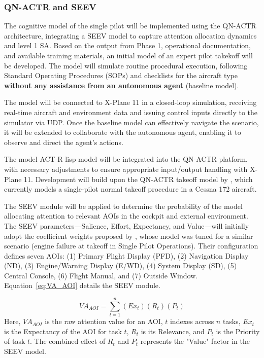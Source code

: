 \documentclass[12pt,a4paper]{article} %
\begin{document}
	\subsubsection{QN-ACTR and SEEV}
	\label{qn-actr-seev}
	The cognitive model of the single pilot will be implemented using the QN-ACTR architecture, integrating a SEEV model to capture attention allocation dynamics and level 1 SA. Based on the output from Phase 1, operational documentation, and available training materials, an initial model of an expert pilot takekoff will be developed. The model will simulate routine procedural execution, following Standard Operating Procedures (SOPs) and checklists for the aircraft type \textbf{without any assistance from an autonomous agent} (baseline model).

	The model will be connected to X-Plane 11 in a closed-loop simulation, receiving real-time aircraft and environment data and issuing control inputs directly to the simulator via UDP. Once the baseline model can effectively navigate the scenario, it will be extended to collaborate with the autonomous agent, enabling it to observe and direct the agent's actions.
	
	The model ACT-R lisp model will be integrated into the QN-ACTR platform, with necessary adjustments to ensure appropriate input/output handling with X-Plane 11. Development will build upon the QN-ACTR takeoff model by \textcite{xu_modeling_2021}, which currently models a single-pilot normal takeoff procedure in a Cessna 172 aircraft.
	
	The SEEV module will be applied to determine the probability of the model allocating attention to relevant AOIs in the cockpit and external environment. The SEEV parameters—Salience, Effort, Expectancy, and Value—will initially adopt the coefficient weights proposed by \textcite{wang_real-time_2024}, whose model was tuned for a similar scenario (engine failure at takeoff in Single Pilot Operations). Their configuration defines seven AOIs: (1) Primary Flight Display (PFD), (2) Navigation Display (ND), (3) Engine/Warning Display (E/WD), (4) System Display (SD), (5) Central Console, (6) Flight Manual, and (7) Outside Window. Equation~\ref{eq:VA_AOI} details the SEEV module.
	
	\begin{equation}
		VA_{AOI} = \sum_{t=1}^{n} (Ex_t) (R_t) (P_t)
		\label{eq:VA_AOI}
	\end{equation}
	Here, $VA_{AOI}$ is the raw attention value for an AOI, $t$ indexes across $n$ tasks, $Ex_t$ is the Expectancy of the AOI for task $t$, $R_t$ is its Relevance, and $P_t$ is the Priority of task $t$. The combined effect of $R_t$ and $P_t$ represents the "Value" factor in the SEEV model.
	
\end{document}

